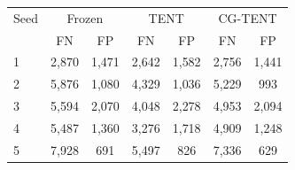 \begin{tabular}{@{}lcccccc@{}}
\toprule
Seed & \multicolumn{2}{c}{Frozen} & \multicolumn{2}{c}{TENT} & \multicolumn{2}{c}{CG-TENT} \\
 & FN & FP & FN & FP & FN & FP \\
\midrule
1 & 2{,}870 & 1{,}471 & 2{,}642 & 1{,}582 & 2{,}756 & 1{,}441 \\
2 & 5{,}876 & 1{,}080 & 4{,}329 & 1{,}036 & 5{,}229 & 993 \\
3 & 5{,}594 & 2{,}070 & 4{,}048 & 2{,}278 & 4{,}953 & 2{,}094 \\
4 & 5{,}487 & 1{,}360 & 3{,}276 & 1{,}718 & 4{,}909 & 1{,}248 \\
5 & 7{,}928 & 691 & 5{,}497 & 826 & 7{,}336 & 629 \\
\bottomrule
\end{tabular}

